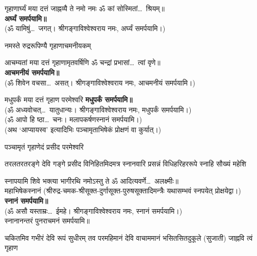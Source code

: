 \begin{center}
{गृहाणार्घ्यं मया दत्तं जाह्नव्यै ते नमो नमः}
ॐ कां सोस्मितां\ldots\ श्रियम्॥\\
\textbf{\devAya{} अर्घ्यं समर्पयामि॥}\\
(ॐ यामिषुं\ldots\ जगत्। श्रीगङ्गाविश्वेश्वराय नमः, अर्घ्यं समर्पयामि।)


{नमस्ते रुद्ररूपिण्यै गृहाणाचमनीयकम्}

{आचम्यतां मया दत्तं गृहाणामृतवर्षिणि}
ॐ चन्द्रां प्रभासां\ldots\ त्वां वृणे॥\\
\textbf{\devAya{} आचमनीयं समर्पयामि॥}\\
(ॐ शिवेन वचसा\ldots\ असत्। श्रीगङ्गाविश्वेश्वराय नमः, आचमनीयं समर्पयामि।)


{मधुपर्कं मया दत्तं गृहाण परमेश्वरि}
\textbf{\devAya{} मधुपर्कं समर्पयामि॥}\\
(ॐ अध्यवोचत्\ldots\ यातुधान्यः। श्रीगङ्गाविश्वेश्वराय नमः, मधुपर्कं समर्पयामि।)\\
(ॐ आपो हि ष्ठा\ldots\ चनः। मलापकर्षणस्नानं समर्पयामि।)\\
(अथ `आप्यायस्व' इत्यादिभिः पञ्चामृताभिषेकं प्रोक्षणं वा कुर्यात्।)

{पञ्चामृतं गृहाणेदं प्रसीद परमेश्वरि}


{तरलतरतरङ्गे देवि गङ्गे प्रसीद}
{विनिहितमिदमत्र स्नानवारि प्रसन्नं}
{विधिहरिहररूपे स्नाहि सौख्यं महेशि}

{स्नापयामि शिवे भक्त्या भागीरथि नमोऽस्तु ते}
ॐ आदित्यवर्णे\ldots\ अलक्ष्मीः॥\\
{\small महाभिषेकस्नानं (श्रीरुद्र-चमक-श्रीसूक्त-दुर्गासूक्त-पुरुषसूक्तादिमन्त्रैः यथासम्भवं स्नपयेत् प्रोक्षयेद्वा।)}\\
\textbf{\devAya{} स्नानं समर्पयामि॥}\\
(ॐ असौ यस्ताम्रः\ldots\ ईमहे। श्रीगङ्गाविश्वेश्वराय नमः, स्नानं समर्पयामि।)\\
स्नानानन्तरं पुनराचमनं समर्पयामि॥


{चकितमिव गभीरं देवि रूपं सुधीरम्}
{तव परमहिमानं देवि वाचाममानं}
{भसितसितदुकूले (सुजाती) जाह्नवि त्वं गृहाण}


\end{center}

